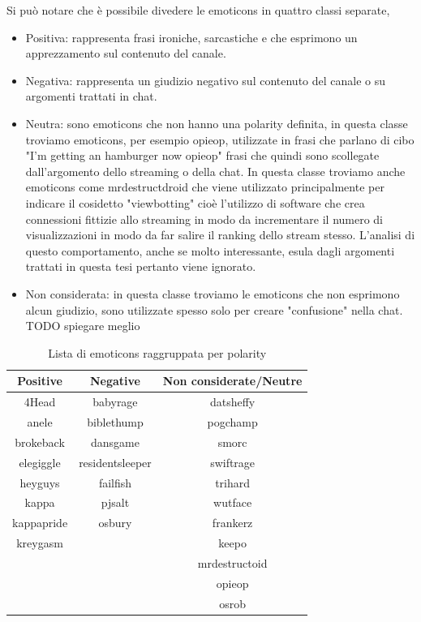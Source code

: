 \documentclass[a4paper,12pt,openright,twoside]{report}
\theoremstyle{definition}
\begin{document}
Si può notare che è possibile divedere le emoticons in quattro classi separate, 
\begin{itemize}
\item Positiva: rappresenta frasi ironiche, sarcastiche e che esprimono un apprezzamento sul contenuto del canale.
\item Negativa: rappresenta un giudizio negativo sul contenuto del canale o su argomenti trattati in chat.
\item Neutra: sono emoticons che non hanno una polarity definita, in questa classe troviamo emoticons, per esempio opieop, utilizzate in frasi che parlano di cibo "I'm getting an hamburger now opieop" frasi che quindi sono scollegate dall'argomento dello streaming o della chat. In questa classe troviamo anche emoticons come mrdestructdroid che viene utilizzato principalmente per indicare il cosidetto "viewbotting" cioè l'utilizzo di software che crea connessioni fittizie allo streaming in modo da incrementare il numero di visualizzazioni in modo da far salire il ranking dello stream stesso. L'analisi di questo comportamento, anche se molto interessante, esula dagli argomenti trattati in questa tesi pertanto viene ignorato.
\item Non considerata: in questa classe troviamo le emoticons che non esprimono alcun giudizio, sono utilizzate spesso solo per creare "confusione" nella chat. TODO spiegare meglio
\end{itemize}

\begin{table}[h]
\begin{center}
\begin{tabular}{|c|c|c|}
\hline
Positive & Negative & Non considerate/Neutre \\
\hline
4Head & babyrage & datsheffy \\
\hline
anele &  biblethump &  pogchamp \\
\hline
brokeback &  dansgame & smorc \\
\hline
elegiggle & residentsleeper &  swiftrage \\
\hline
heyguys & failfish & trihard \\
\hline
kappa & pjsalt & wutface \\
\hline
kappapride & osbury & frankerz \\
\hline
kreygasm &  & keepo \\
\hline
 & & mrdestructoid \\
\hline
& & opieop \\
\hline
& & osrob \\
\hline
\end{tabular}
\end{center}
\caption{Lista di emoticons raggruppata per polarity}
\label{tab:emoticons2}
\end{table}
\end{document}
